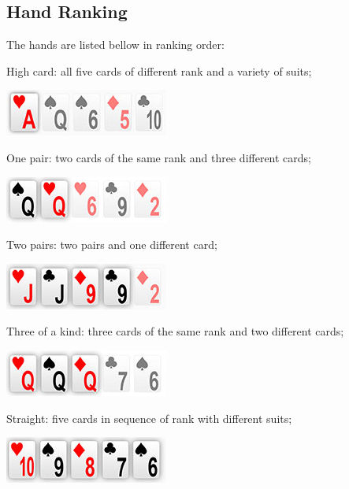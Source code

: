 \subsection{Hand Ranking}

The hands are listed bellow in ranking order:

High card: all five cards of different rank and a variety of suits;

\begin{center}
\includegraphics[scale=2]{high-card}
\end{center}

One pair: two cards of the same rank and three different cards;

\begin{center}
\includegraphics[scale=2]{pair}
\end{center}

Two pairs: two pairs and one different card;

\begin{center}
\includegraphics[scale=2]{two-pairs}
\end{center}

Three of a kind: three cards of the same rank and two different cards;

\begin{center}
\includegraphics[scale=2]{three-of-a-kind}
\end{center}

Straight: five cards in sequence of rank with different suits;

\begin{center}
\includegraphics[scale=2]{straight}
\end{center}

